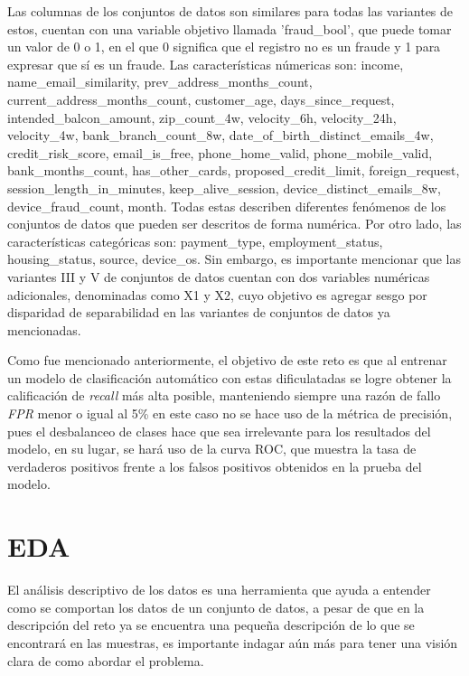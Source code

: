 \documentclass[runningheads]{llncs}
\begin{document}
Las columnas de los conjuntos de datos son similares para todas las variantes de estos, cuentan con una variable objetivo llamada 'fraud\_bool', que puede tomar un valor de 0 o 1, en el que 0 significa que el registro no es un fraude y 1 para expresar que sí es un fraude. Las características númericas son: income, name\_email\_similarity, prev\_address\_months\_count, current\_address\_months\_count, customer\_age, days\_since\_request, intended\_balcon\_amount, zip\_count\_4w, velocity\_6h, velocity\_24h, velocity\_4w, bank\_branch\_count\_8w, date\_of\_birth\_distinct\_emails\_4w, credit\_risk\_score, email\_is\_free, phone\_home\_valid, phone\_mobile\_valid, bank\_months\_count, has\_other\_cards, proposed\_credit\_limit, foreign\_request, session\_length\_in\_minutes, keep\_alive\_session, device\_distinct\_emails\_8w, device\_fraud\_count, month. Todas estas describen diferentes fenómenos de los conjuntos de datos que pueden ser descritos de forma numérica.
Por otro lado, las características categóricas son: payment\_type, employment\_status, housing\_status, source, device\_os. 
Sin embargo, es importante mencionar que las variantes III y V de conjuntos de datos cuentan con dos variables numéricas adicionales, denominadas como X1 y X2, cuyo objetivo es agregar sesgo por disparidad de separabilidad en las variantes de conjuntos de datos ya mencionadas.

Como fue mencionado anteriormente, el objetivo de este reto es que al entrenar un modelo de clasificación automático con estas dificulatadas se logre obtener la calificación de \textit{recall} más alta posible, manteniendo siempre una razón de fallo \textit{FPR} menor o igual al 5\% en este caso no se hace uso de la métrica de precisión, pues el desbalanceo de clases hace que sea irrelevante para los resultados del modelo, en su lugar, se hará uso de la curva ROC, que muestra la tasa de verdaderos positivos frente a los falsos positivos obtenidos en la prueba del modelo.



\section{EDA}
El análisis descriptivo de los datos es una herramienta que ayuda a entender como se comportan los datos de un conjunto de datos, a pesar de que en la descripción del reto ya se encuentra una pequeña descripción de lo que se encontrará en las muestras, es importante indagar aún más para tener una visión clara de como abordar el problema.
\end{document}
